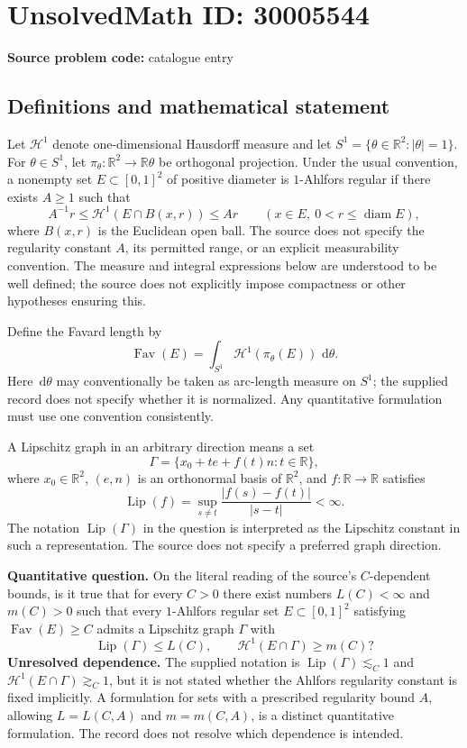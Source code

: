 \documentclass[11pt]{article}
\newcommand{\R}{\mathbb{R}}
\newcommand{\dd}{\,\mathrm{d}}
\begin{document}
\section*{UnsolvedMath ID: 30005544}
\textbf{Source problem code:} catalogue entry
\subsection{Definitions and mathematical statement}
Let $\mathcal H^1$ denote one-dimensional Hausdorff measure and let $S^1=\{\theta\in\R^2:|\theta|=1\}$. For $\theta\in S^1$, let $\pi_\theta:\R^2\to\R\theta$ be orthogonal projection. Under the usual convention, a nonempty set $E\subset[0,1]^2$ of positive diameter is $1$-Ahlfors regular if there exists $A\geq1$ such that
\[
 A^{-1}r\leq\mathcal H^1(E\cap B(x,r))\leq Ar
 \qquad(x\in E,\ 0<r\leq\operatorname{diam}E),
\]
where $B(x,r)$ is the Euclidean open ball. The source does not specify the regularity constant $A$, its permitted range, or an explicit measurability convention. The measure and integral expressions below are understood to be well defined; the source does not explicitly impose compactness or other hypotheses ensuring this.

Define the Favard length by
\[
 \operatorname{Fav}(E)=\int_{S^1}\mathcal H^1(\pi_\theta(E))\,\dd\theta.
\]
Here $\dd\theta$ may conventionally be taken as arc-length measure on $S^1$; the supplied record does not specify whether it is normalized. Any quantitative formulation must use one convention consistently.

A Lipschitz graph in an arbitrary direction means a set
\[
 \Gamma=\{x_0+te+f(t)n:t\in\R\},
\]
where $x_0\in\R^2$, $(e,n)$ is an orthonormal basis of $\R^2$, and $f:\R\to\R$ satisfies
\[
 \operatorname{Lip}(f)=\sup_{s\ne t}\frac{|f(s)-f(t)|}{|s-t|}<\infty.
\]
The notation $\operatorname{Lip}(\Gamma)$ in the question is interpreted as the Lipschitz constant in such a representation. The source does not specify a preferred graph direction.

\textbf{Quantitative question.} On the literal reading of the source's $C$-dependent bounds, is it true that for every $C>0$ there exist numbers $L(C)<\infty$ and $m(C)>0$ such that every $1$-Ahlfors regular set $E\subset[0,1]^2$ satisfying $\operatorname{Fav}(E)\geq C$ admits a Lipschitz graph $\Gamma$ with
\[
 \operatorname{Lip}(\Gamma)\leq L(C),
 \qquad
 \mathcal H^1(E\cap\Gamma)\geq m(C)?
\]
\textbf{Unresolved dependence.} The supplied notation is $\operatorname{Lip}(\Gamma)\lesssim_C1$ and $\mathcal H^1(E\cap\Gamma)\gtrsim_C1$, but it is not stated whether the Ahlfors regularity constant is fixed implicitly. A formulation for sets with a prescribed regularity bound $A$, allowing $L=L(C,A)$ and $m=m(C,A)$, is a distinct quantitative formulation. The record does not resolve which dependence is intended.
\end{document}
